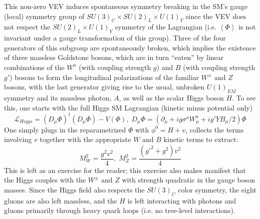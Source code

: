This non-zero VEV induces spontaneous symmetry breaking in the SM's gauge (local) symmetry group of $SU\left(3\right)_C\times SU\left(2\right)_L\times U\left(1\right)_Y$ since the VEV does not respect the $SU\left(2\right)_L\times U\left(1\right)_Y$ symmetry of the Lagrangian (i.e. $\left<\Phi\right>$ is not invariant under a gauge transformation of this group).  Three of the four generators of this subgroup are spontaneously broken, which implies the existence of three massless Goldstone bosons, which are in turn ``eaten'' by linear combinations of the $W^a$ (with coupling strength $g$) and $B$ (with coupling strength $g'$) bosons to form the longitudinal polarizations of the familiar $W^{\pm}$ and $Z$ bosons, with the last generator giving rise to the usual, unbroken $U\left(1\right)_{EM}$ symmetry and its massless photon, $A$, as well as the scalar Higgs boson $H$.  To see this, one starts with the full Higgs SM Lagrangian (kinetic minus potential only)
\begin{equation}
\mathcal{L}_{Higgs}=\left(D_{\mu}\Phi\right)^\dagger\left(D_{\mu}\Phi\right)-V\left(\Phi\right),\; D_{\mu}\Phi = \left(\partial_{\mu}+ig\sigma^a W^a_\mu + ig'YB_\mu/2\right)\Phi
\end{equation}
One simply plugs in the reparametrized $\Phi$ with $\phi^0=H+v$, collects the terms involving $v$ together with the appropriate $W$ and $B$ kinetic terms to extract:
\begin{equation}
M_W^2=\frac{g^2v^2}{4},\;M_Z^2=\frac{\left(g'^2+g^2\right)v^2}{4}
\end{equation}
This is left as an exercise for the reader; this exercise also makes manifest that the Higgs couples with the $W^\pm$ and $Z$ with strength quadratic in the gauge boson masses.  Since the Higgs field also respects the $SU\left(3\right)_C$ color symmetry, the eight gluons are also left massless, and the $H$ is left interacting with photons and gluons primarily through heavy quark loops (i.e. no tree-level interactions).

